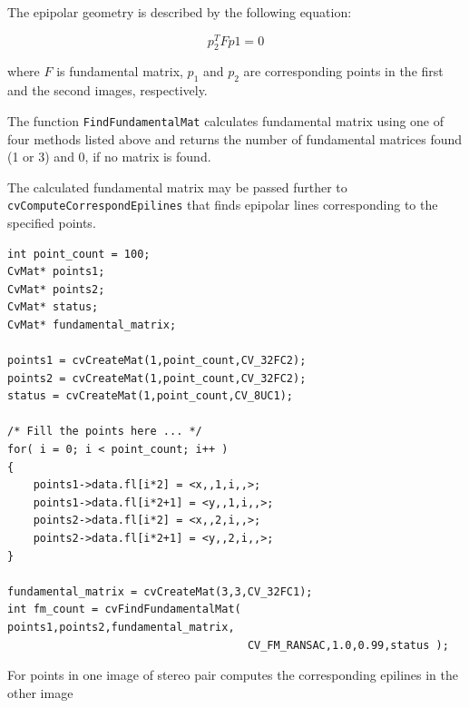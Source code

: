 The epipolar geometry is described by the following equation:

\[ p_2^T F p1=0 \]

where $F$ is fundamental matrix, $p_1$ and $p_2$ are corresponding points in the first and the second images, respectively.

The function \texttt{FindFundamentalMat} calculates fundamental
matrix using one of four methods listed above and returns the number
of fundamental matrices found (1 or 3) and 0, if no matrix is found.

The calculated fundamental matrix may be passed further to
\texttt{cvComputeCorrespondEpilines} that finds epipolar lines
corresponding to the specified points.

\begin{lstlisting}
int point_count = 100;
CvMat* points1;
CvMat* points2;
CvMat* status;
CvMat* fundamental_matrix;

points1 = cvCreateMat(1,point_count,CV_32FC2);
points2 = cvCreateMat(1,point_count,CV_32FC2);
status = cvCreateMat(1,point_count,CV_8UC1);

/* Fill the points here ... */
for( i = 0; i < point_count; i++ )
{
    points1->data.fl[i*2] = <x,,1,i,,>;
    points1->data.fl[i*2+1] = <y,,1,i,,>;
    points2->data.fl[i*2] = <x,,2,i,,>;
    points2->data.fl[i*2+1] = <y,,2,i,,>;
}

fundamental_matrix = cvCreateMat(3,3,CV_32FC1);
int fm_count = cvFindFundamentalMat( points1,points2,fundamental_matrix,
                                     CV_FM_RANSAC,1.0,0.99,status );
\end{lstlisting}

\label{ComputeCorrespondEpilines}

For points in one image of stereo pair computes the corresponding epilines in the other image


\begin{description}
\end{description}

